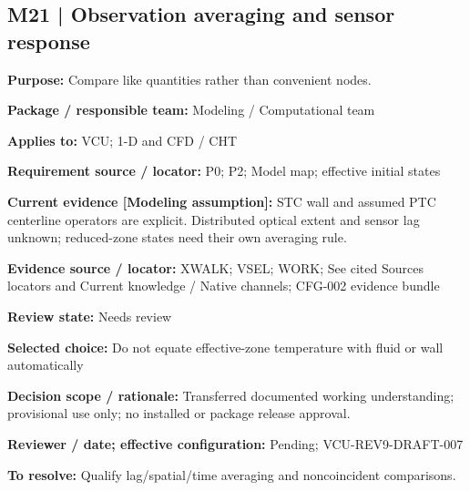 \documentclass[11pt]{article}
\begin{document}
\par\noindent\begin{minipage}{\textwidth}\small\setlength{\parskip}{2pt}
\subsection*{M21 | Observation averaging and sensor response}
\textbf{Purpose:} Compare like quantities rather than convenient nodes.\par
\textbf{Package / responsible team:} Modeling / Computational team\par
\textbf{Applies to:} VCU; 1-D and CFD / CHT\par
\textbf{Requirement source / locator:} P0; P2; Model map; effective initial states\par
\textbf{Current evidence [Modeling assumption]:} STC wall and assumed PTC centerline operators are explicit. Distributed optical extent and sensor lag unknown; reduced-zone states need their own averaging rule.\par
\textbf{Evidence source / locator:} XWALK; VSEL; WORK; See cited Sources locators and Current knowledge / Native channels; CFG-002 evidence bundle\par
\textbf{Review state:} Needs review\par
\textbf{Selected choice:} Do not equate effective-zone temperature with fluid or wall automatically\par
\textbf{Decision scope / rationale:} Transferred documented working understanding; provisional use only; no installed or package release approval.\par
\textbf{Reviewer / date; effective configuration:} Pending; VCU-REV9-DRAFT-007\par
\textbf{To resolve:} Qualify lag/spatial/time averaging and noncoincident comparisons.\par
\end{minipage}\par\vspace{5pt}
\end{document}
